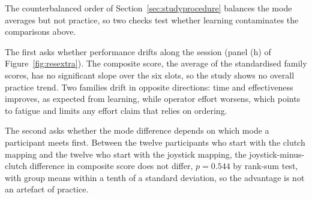 The counterbalanced order of Section~\ref{sec:studyprocedure} balances the mode averages but not practice, so two checks test whether learning contaminates the comparisons above.

The first asks whether performance drifts along the session (panel (h) of Figure~\ref{fig:resextra}). The composite score, the average of the standardised family scores, has no significant slope over the six slots, so the study shows no overall practice trend. Two families drift in opposite directions: time and effectiveness improves, as expected from learning, while operator effort worsens, which points to fatigue and limits any effort claim that relies on ordering.

The second asks whether the mode difference depends on which mode a participant meets first. Between the twelve participants who start with the clutch mapping and the twelve who start with the joystick mapping, the joystick-minus-clutch difference in composite score does not differ, $p = 0.544$ by rank-sum test, with group means within a tenth of a standard deviation, so the advantage is not an artefact of practice.






